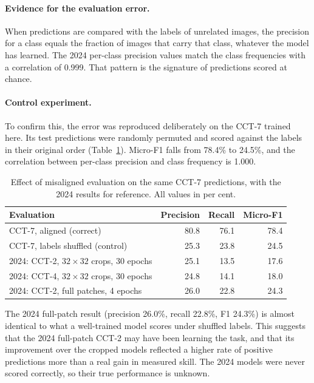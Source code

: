 \documentclass[11pt]{article}
\begin{document}
\paragraph{Evidence for the evaluation error.}
When predictions are compared with the labels of unrelated images, the precision for a class equals the
fraction of images that carry that class, whatever the model has learned. The 2024 per-class precision
values match the class frequencies with a correlation of 0.999. That pattern is the signature of
predictions scored at chance.

\paragraph{Control experiment.}
To confirm this, the error was reproduced deliberately on the CCT-7 trained here. Its test predictions
were randomly permuted and scored against the labels in their original order
(Table~\ref{tab:control}). Micro-F1 falls from 78.4\% to 24.5\%, and the correlation between per-class
precision and class frequency is 1.000.

\begin{table}[!htbp]
\centering
\caption{Effect of misaligned evaluation on the same CCT-7 predictions, with the 2024 results for
reference. All values in per cent.}
\label{tab:control}
\begin{tabular}{lrrr}
\toprule
Evaluation & Precision & Recall & Micro-F1 \\
\midrule
CCT-7, aligned (correct)                 & 80.8 & 76.1 & 78.4 \\
CCT-7, labels shuffled (control)         & 25.3 & 23.8 & 24.5 \\
\midrule
2024: CCT-2, $32\times32$ crops, 30 epochs   & 25.1 & 13.5 & 17.6 \\
2024: CCT-4, $32\times32$ crops, 30 epochs   & 24.8 & 14.1 & 18.0 \\
2024: CCT-2, full patches, 4 epochs          & 26.0 & 22.8 & 24.3 \\
\bottomrule
\end{tabular}
\end{table}

The 2024 full-patch result (precision 26.0\%, recall 22.8\%, F1 24.3\%) is almost identical to what a
well-trained model scores under shuffled labels. This suggests that the 2024 full-patch CCT-2 may have
been learning the task, and that its improvement over the cropped models reflected a higher rate of
positive predictions more than a real gain in measured skill. The 2024 models were never scored correctly,
so their true performance is unknown.
\end{document}
